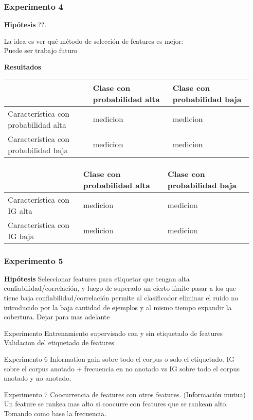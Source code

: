 \subsubsection{Experimento 4}
\textbf{Hipótesis} ??.

La idea es ver qué método de selección de features es mejor:\\

Puede ser trabajo futuro



\textbf{Resultados}\\

\begin{tabular}{||p{4cm} | l | l||}
\hline
 & Clase con probabilidad alta & Clase con probabilidad baja \\
\hline
Característica con probabilidad alta & medicion & medicion \\
\hline
Característica con probabilidad baja & medicion & medicion \\
\hline
\end{tabular}
\hfill
\begin{tabular}{||p{4cm} | l | l||}
\hline
 & Clase con probabilidad alta & Clase con probabilidad baja \\
\hline
Característica con IG alta & medicion & medicion \\
\hline
Característica con IG baja & medicion & medicion \\
\hline

\end{tabular}



\subsubsection{Experimento 5}
\textbf{Hipótesis} Seleccionar features para etiquetar que tengan alta confiabilidad/correlación, y luego de superado un cierto límite pasar a los que tiene baja confiabilidad/correlación permite al clasificador eliminar el ruido no introducido por la baja cantidad de ejemplos y al mismo tiempo expandir la cobertura.
Dejar para mas adelante


Experimento Entrenamiento supervisado con y sin etiquetado de  features
Validacion del etiquetado de features



Experimento 6
Information gain sobre todo el corpus o solo el etiquetado.
IG sobre el corpus anotado + frecuencia en no anotado vs IG sobre todo el corpus anotado y no anotado.


Experimento 7
Coocurrencia de features con otros features. (Información mutua)
Un feature se rankea mas alto si coocurre con features que se rankean alto. Tomando como base la frecuencia.
